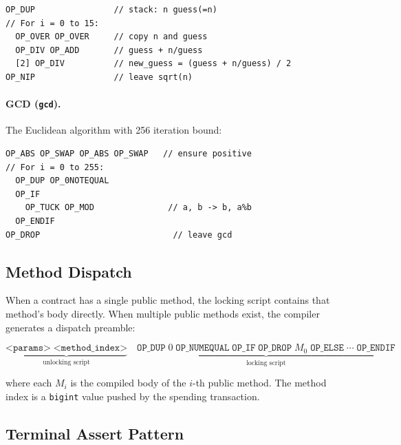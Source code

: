 \documentclass[11pt,a4paper]{article}
\newcommand{\op}[1]{\texttt{OP\_#1}}
\newcommand{\bigintty}{\texttt{bigint}}
\begin{document}
\begin{lstlisting}[style=script]
OP_DUP                // stack: n guess(=n)
// For i = 0 to 15:
  OP_OVER OP_OVER     // copy n and guess
  OP_DIV OP_ADD       // guess + n/guess
  [2] OP_DIV          // new_guess = (guess + n/guess) / 2
OP_NIP                // leave sqrt(n)
\end{lstlisting}

\paragraph{GCD (\texttt{gcd}).}
The Euclidean algorithm with 256 iteration bound:

\begin{lstlisting}[style=script]
OP_ABS OP_SWAP OP_ABS OP_SWAP   // ensure positive
// For i = 0 to 255:
  OP_DUP OP_0NOTEQUAL
  OP_IF
    OP_TUCK OP_MOD               // a, b -> b, a%b
  OP_ENDIF
OP_DROP                           // leave gcd
\end{lstlisting}

\subsection{Method Dispatch}
\label{sec:codegen-dispatch}

When a contract has a single public method, the locking script contains
that method's body directly. When multiple public methods exist, the
compiler generates a dispatch preamble:

\[
\underbrace{\texttt{<params>}\; \texttt{<method\_index>}}_{\text{unlocking script}}
\quad
\underbrace{
  \op{DUP}\; 0\; \op{NUMEQUAL}\; \op{IF}\; \op{DROP}\; M_0\;
  \op{ELSE}\; \cdots\; \op{ENDIF}
}_{\text{locking script}}
\]

where each $M_i$ is the compiled body of the $i$-th public method. The
method index is a \bigintty{} value pushed by the spending transaction.

\subsection{Terminal Assert Pattern}
\label{sec:codegen-terminal}
\end{document}
